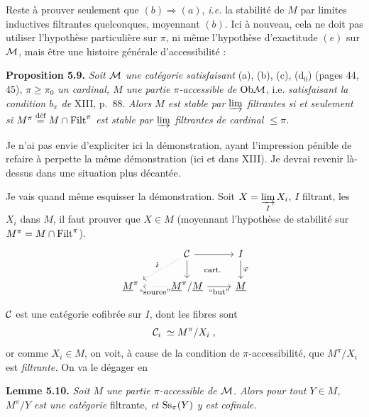 Reste à prouver seulement que $(b) \Longrightarrow (a)$, \textit{i.e.} la stabilité de $M$ par limites inductives filtrantes quelconques, moyennant $(b)$. Ici à nouveau, cela ne doit pas utiliser l'hypothèse particulière sur $\pi$, ni même l'hypothèse d'exactitude $(e)$ sur $\mathcal{M}$, mais être une histoire générale d'accessibilité :

\textbf{Proposition 5.9.} \textit{Soit $\mathcal{M}$ une catégorie satisfaisant} (a), (b), (c), (d$_0$) (pages 44, 45), \textit{$\pi \geq \pi_0$ un cardinal, $M$ une partie $\pi$-accessible de} $\mathrm{Ob}\mathcal{M}$, i.e. \textit{satisfaisant la condition $b_\pi$ de} XIII, p.~88. \textit{Alors $M$ est stable par $\varinjlim$ filtrantes si et seulement si $M^\pi \overset{\text{déf}}{=} M \cap \mathrm{Filt}^\pi$ est stable par $\varinjlim$ filtrantes de cardinal $\leq \pi$.}

Je n'ai pas envie d'expliciter ici la démonstration, ayant l'impression pénible de refaire à perpette la même démonstration (ici et dans XIII). Je devrai revenir là-dessus dans une situation plus décantée.


Je vais quand même esquisser la démonstration. Soit $X = \varinjlim\limits_{I} X_i$, $I$ filtrant, les $X_i$ dans $M$, il faut prouver que $X \in M$ (moyennant l'hypothèse de stabilité sur $M^\pi = M \cap \mathrm{Filt}^\pi$).
\[
\begin{tikzcd}
& \Ci \arrow[r] \arrow[d] \arrow[dl, dotted, "\mathfrak{z}"'] \arrow[dr, phantom, "\text{\footnotesize cart.}"] & I \arrow[d, "\varphi"] \\
\underline{M}^\pi & \underline{M}^\pi/\underline{M} \arrow[l, dotted, "\text{\footnotesize “source”}"] \arrow[r, "\text{\footnotesize “but”}"'] & \underline{M}
\end{tikzcd}
\] %

$\mathcal{C}$ est une catégorie cofibrée sur $I$, dont les fibres sont
\[
\mathcal{C}_i \;\simeq M^\pi/X_i \;,
\]
or comme $X_i \in M$, on voit, à cause de la condition de $\pi$-accessibilité, que $M^\pi/X_i$ est \textit{filtrante.} On va le dégager en

\textbf{Lemme 5.10.} \textit{Soit $M$ une partie $\pi$-accessible de $\mathcal{M}$. Alors pour tout $Y \in M$, $M^\pi/Y$ est une catégorie} filtrante, \textit{et $\mathrm{Ss}_\pi(Y)$ y est cofinale.}


